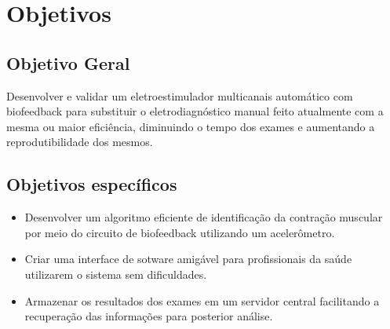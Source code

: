 \section{Objetivos}

\subsection{Objetivo Geral}
Desenvolver e validar um eletroestimulador multicanais automático com biofeedback para substituir o eletrodiagnóstico manual feito atualmente com a mesma ou maior eficiência, diminuindo o tempo dos exames e aumentando a reprodutibilidade dos mesmos.
\subsection{Objetivos específicos}
\begin{itemize}
  \item Desenvolver um algoritmo eficiente de identificação da contração muscular por meio do circuito de biofeedback utilizando um acelerômetro.
  \item Criar uma interface de sotware amigável para profissionais da saúde utilizarem o sistema sem dificuldades.
  \item Armazenar os resultados dos exames em um servidor central facilitando a recuperação das informações para posterior análise.
\end{itemize}